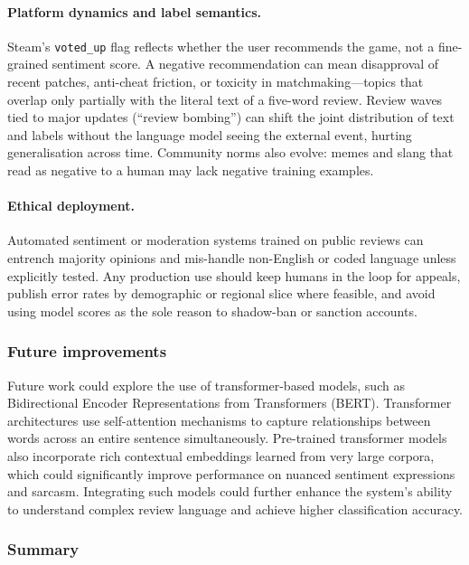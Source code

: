 \documentclass[12pt,a4paper]{article}
\begin{document}
\paragraph{Platform dynamics and label semantics.}
Steam's \texttt{voted\_up} flag reflects whether the user recommends the game, not a fine-grained sentiment score. A negative recommendation can mean disapproval of recent patches, anti-cheat friction, or toxicity in matchmaking---topics that overlap only partially with the literal text of a five-word review. Review waves tied to major updates (``review bombing'') can shift the joint distribution of text and labels without the language model seeing the external event, hurting generalisation across time. Community norms also evolve: memes and slang that read as negative to a human may lack negative training examples.

\paragraph{Ethical deployment.}
Automated sentiment or moderation systems trained on public reviews can entrench majority opinions and mis-handle non-English or coded language unless explicitly tested. Any production use should keep humans in the loop for appeals, publish error rates by demographic or regional slice where feasible, and avoid using model scores as the sole reason to shadow-ban or sanction accounts.

\subsubsection{Future improvements}

Future work could explore the use of transformer-based models, such as Bidirectional Encoder Representations from Transformers (BERT). Transformer architectures use self-attention mechanisms to capture relationships between words across an entire sentence simultaneously. Pre-trained transformer models also incorporate rich contextual embeddings learned from very large corpora, which could significantly improve performance on nuanced sentiment expressions and sarcasm. Integrating such models could further enhance the system's ability to understand complex review language and achieve higher classification accuracy.

\subsubsection{Summary}
\end{document}
